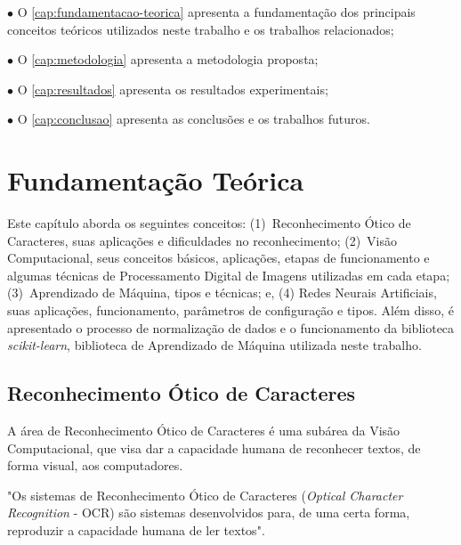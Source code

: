 \documentclass[12pt,oneside,a4paper,chapter=TITLE,section=TITLE,sumario
		=tradicional]{abntex2}
\begin{document}
		\begin{lista}
			\item[$\bullet$] O \autoref{cap:fundamentacao-teorica} apresenta a fundamentação dos principais conceitos teóricos utilizados neste trabalho e os trabalhos relacionados;
			
			\item[$\bullet$] O \autoref{cap:metodologia} apresenta a metodologia proposta;
			
			\item[$\bullet$] O \autoref{cap:resultados} apresenta os resultados experimentais;
			
			\item[$\bullet$] O \autoref{cap:conclusao} apresenta as conclusões e os trabalhos futuros.
		\end{lista}
		
		\chapter{Fundamentação Teórica}
		\label{cap:fundamentacao-teorica}
		
		Este capítulo aborda os seguintes conceitos: (1)~Reconhecimento Ótico de Caracteres, suas aplicações e dificuldades no reconhecimento; (2)~Visão Computacional, seus conceitos básicos, aplicações, etapas de funcionamento e algumas técnicas de Processamento Digital de Imagens utilizadas em cada etapa; (3)~Aprendizado de Máquina, tipos e técnicas; e, (4) Redes Neurais Artificiais, suas aplicações, funcionamento, parâmetros de configuração e tipos. Além disso, é apresentado o processo de normalização de dados e o funcionamento da biblioteca \textit{scikit-learn}, biblioteca de Aprendizado de Máquina utilizada neste trabalho.
		
		\section{Reconhecimento Ótico de Caracteres}
		
		A área de Reconhecimento Ótico de Caracteres é uma subárea da Visão Computacional, que visa dar a capacidade humana de reconhecer textos, de forma visual, aos computadores.
		
		\begin{citacao}
			"Os sistemas de Reconhecimento Ótico de Caracteres (\textit{Optical Character Recognition} - OCR) são sistemas desenvolvidos para, de uma certa forma, reproduzir a capacidade humana de ler textos"\hspace{0.1cm}\cite{osorio1991estudo}. 
		\end{citacao}
			
\end{document}
